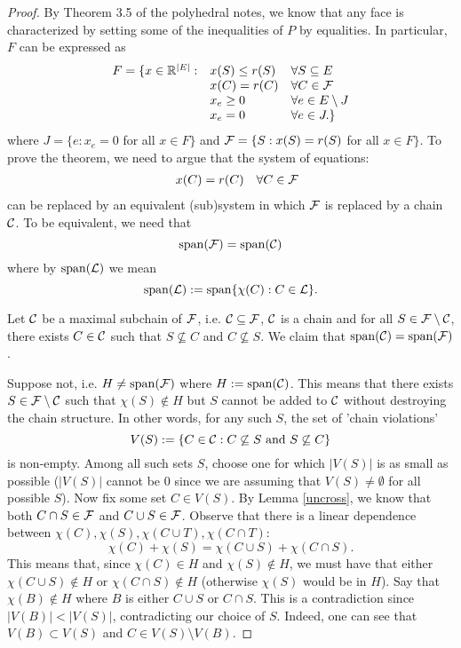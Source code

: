 \documentclass[12pt]{article}
\newcommand{\spa}{\operatorname{span}}
\begin{document}
\begin{proof}
By Theorem 3.5 of the polyhedral notes, we know that any face is
characterized by setting some of the inequalities of $P$ by
equalities. In particular, $F$ can be expressed as 
$$\begin{array}{rll} 
F = \{x\in {\mathbb R}^{|E|}: & x(S) \leq r(S) & \forall S\subseteq E \\
& x(C) =r(C) & \forall C\in {\bf {\cal F}} \\
& x_e \geq 0 & \forall e\in E\setminus J \\
& x_e = 0 & \forall e\in J.\}
\end{array}$$
where $J=\{e: x_e=0$ for all $x\in F\}$ and ${\cal F}=\{S: x(S)=r(S)$
for all $x\in F\}$. To prove the theorem, we need to argue that the
system of equations:
$$\begin{array}{rll} 
& x(C) =r(C) & \forall C\in {\cal F}
\end{array}$$ 
can be replaced by an equivalent (sub)system in which ${\cal F}$ is
replaced by a chain ${\cal C}$. To be equivalent, we need that
$$\spa({\cal F})=\spa({\cal C})$$
where by $\spa({\cal L})$ we mean 
$$\spa({\cal L}):=\spa\{\chi(C): C\in {\cal L}\}.$$

Let ${\cal C}$ be a maximal subchain of ${\cal F}$, i.e. ${\cal
  C}\subseteq {\cal F}$, ${\cal C}$ is a chain and for all $S\in {\cal
  F}\setminus {\cal C}$, there exists $C\in {\cal C}$ such that
$S\not\subseteq C$ and $C\not\subseteq S$. We claim that $\spa({\cal
  C})=\spa({\cal F})$.

Suppose not, i.e. $H\neq \spa({\cal F})$ where
$H:=\spa({\cal C})$. This means that there exists $S\in {\cal
  F}\setminus {\cal C}$ such that $\chi(S)\notin H$ but $S$ cannot be
added to ${\cal C}$ without destroying the chain structure. In other
words, for any such $S$, the set of 'chain violations'
$$V(S):= \{C\in {\cal C}: C\not\subseteq S \mbox{ and } S\not\subseteq
C\}$$ is non-empty. Among all such sets $S$, choose one for which
$|V(S)|$ is as small as possible ($|V(S)|$ cannot be 0 since we are
assuming that $V(S)\neq \emptyset$ for all possible $S$). Now fix some
set $C\in V(S)$. By Lemma \ref{uncross}, we know that both $C\cap S\in
{\cal F}$ and $C\cup S\in {\cal F}$. Observe that there is a linear
dependence between $\chi(C), \chi(S), \chi(C\cup T), \chi(C\cap T)$:
$$ \chi(C)+ \chi(S) = \chi(C\cup S)+ \chi(C\cap S).$$
This means that, since $\chi(C)\in H$ and $\chi(S)\notin H$, we must
have that either $\chi(C\cup S)\notin H$ or $\chi(C\cap S)\notin H$
(otherwise $\chi(S)$ would be in $H$). Say that $\chi(B)\notin H$
where $B$ is either $C\cup S$ or $C\cap S$. This is a contradiction
since $|V(B)| < |V(S)|$, contradicting our choice of $S$. Indeed, one
can see that $V(B) \subset V(S)$ and $C\in V(S)\setminus V(B)$. 
\end{proof}
\end{document}

